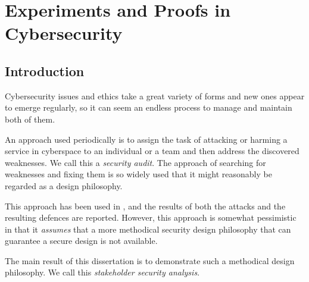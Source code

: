 
\chapter{Experiments and Proofs in Cybersecurity }
\section{Introduction}
\thispagestyle{empty}
\pagestyle{empty}
% 
% 
% 
% 


Cybersecurity issues and ethics take a great variety of forms and new ones appear to emerge regularly, so it can seem an endless process to manage and maintain both of them\cite{josang2005user}. 

An approach used periodically is to assign the task of attacking or harming a service in cyberspace to an individual or a team and then address the discovered weaknesses. We call this a {\em security audit}. The approach of searching for weaknesses and fixing them is so widely used that it might reasonably be regarded as a design philosophy.

This approach has been used in \cite{sheniar2018experiments}, and the results of both the attacks and the resulting defences are reported. However, this approach is somewhat pessimistic in that it {\em assumes} that a more methodical security design philosophy that can guarantee a secure design is not available. 

The main result of this dissertation is to demonstrate such a methodical design philosophy. We call this {\em stakeholder security analysis}.

